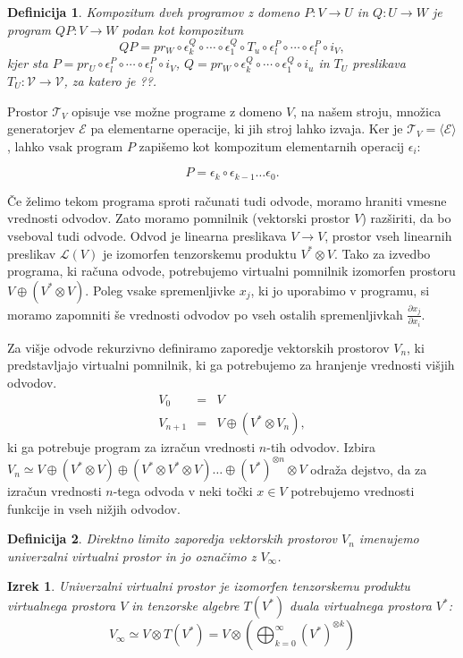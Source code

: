 \documentclass{article}
\newcommand{\E}{\mathcal{E}}
\newcommand{\T}{\mathcal{T}}
\newcommand{\VV}{\mathcal{V}}
\newtheorem{definicija}{Definicija}[section]
\newtheorem{izrek}{Izrek}[section]
\begin{document}
\begin{definicija}
  Kompozitum dveh programov z domeno $P:V\to U$ in $Q:U\to W$ je program
  $QP:V\to W$ podan kot kompozitum
  \begin{equation}
    \label{eq:kompozitum_domena}
    QP = pr_W\circ \epsilon^Q_k\circ\cdots\circ \epsilon_1^Q\circ T_u\circ \epsilon^P_l\circ\cdots\circ \epsilon^P_l\circ i_V,
  \end{equation}
kjer sta $P=pr_U\circ\epsilon^P_l\circ\cdots\circ \epsilon^P_l\circ i_V$,
$Q=pr_W\circ \epsilon^Q_k\circ \cdots \circ\epsilon^Q_1\circ i_u$ in $T_U$
preslikava $T_U:\VV \to \VV$, za katero je ??. 
\end{definicija}

Prostor $\T_V$ opisuje vse možne programe z domeno $V$, na našem
stroju, množica generatorjev $\E$ pa elementarne operacije, ki jih stroj lahko
izvaja. Ker je $\T_V=\langle \E \rangle$, lahko vsak program $P$ zapišemo kot
kompozitum elementarnih operacij $\epsilon_i$:

\[
P = \epsilon_k\circ\epsilon_{k-1}\ldots\epsilon_0.
\]

Če želimo tekom programa sproti računati tudi odvode, moramo hraniti vmesne
vrednosti odvodov. Zato moramo pomnilnik (vektorski prostor $V$) razširiti, da
bo vseboval tudi odvode. Odvod je linearna preslikava $V\to V$, prostor
vseh linearnih preslikav $\mathcal{L}(V)$ je izomorfen tenzorskemu produktu
$V^*\otimes V$. Tako za izvedbo programa, ki računa odvode, potrebujemo virtualni
pomnilnik izomorfen prostoru $V\oplus (V^*\otimes V)$. Poleg vsake spremenljivke $x_j$, ki
jo uporabimo v programu, si moramo zapomniti še vrednosti odvodov po vseh
ostalih spremenljivkah $\frac{\partial x_j}{\partial x_i}$.   

Za višje odvode rekurzivno definiramo zaporedje vektorskih prostorov $V_n$, ki
predstavljajo virtualni pomnilnik, ki ga potrebujemo za hranjenje vrednosti
višjih odvodov.
\begin{eqnarray}\label{eq:V_n}
  \label{eq:prapor}
  V_0 &=& V\\
  V_{n+1}&=&V\oplus (V^*\otimes V_n),
\end{eqnarray} 
ki ga potrebuje program za izračun vrednosti $n$-tih odvodov. Izbira $V_n\simeq
V\oplus (V^*\otimes V) \oplus (V^*\otimes V^*\otimes V) \ldots \oplus
(V^*)^{\otimes n}\otimes V$ odraža dejstvo, da za izračun vrednosti $n$-tega odvoda v neki točki $x\in V$
potrebujemo vrednosti funkcije in vseh nižjih odvodov.
\begin{definicija}
  Direktno limito zaporedja vektorskih prostorov $V_n$ imenujemo
  \emph{univerzalni virtualni prostor} in jo označimo z $V_\infty$.
\end{definicija}
\begin{izrek}
  Univerzalni virtualni prostor je izomorfen tenzorskemu produktu virtualnega
  prostora $V$ in tenzorske algebre $T(V^*)$ duala virtualnega prostora $V^*$:
  \begin{equation}
\label{eq:tenzor_algebra}
    V_\infty\simeq V\otimes T(V^*) = V \otimes\left(\bigoplus_{k=0}^\infty (V^*)^{\otimes k} \right)
\end{equation}

\end{izrek}
\end{document}
